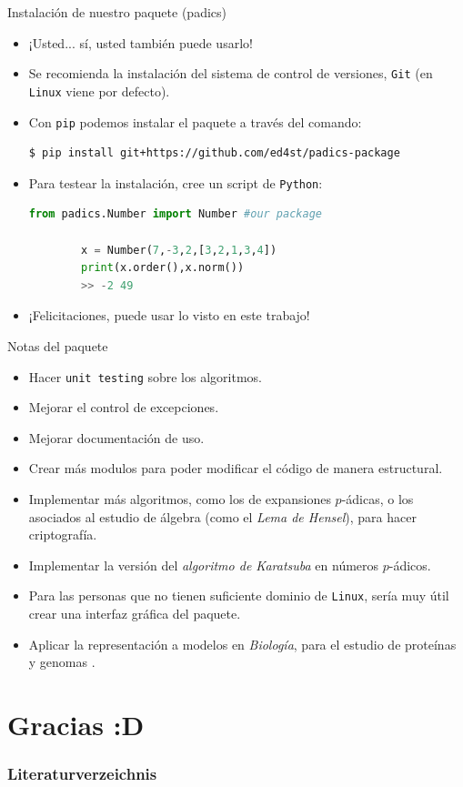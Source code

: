 \documentclass{beamer}
\theoremstyle{definition}
\numberwithin{equation}{section}
\newcommand{\tit}[1]{\textit{#1}}
\begin{document}
\begin{frame}[fragile]{Instalación de nuestro paquete (padics)}
	\begin{itemize}[<+- | alert@+>]
		\item ¡Usted... sí, usted también puede usarlo!
		\item Se recomienda la instalación del sistema de control de versiones, \texttt{Git} (en \texttt{Linux} viene por defecto).
		\item Con \texttt{pip} podemos instalar el paquete a través del comando:
		\begin{lstlisting}[caption=Terminal o símbolo del sistema,basicstyle=\tiny]
		$ pip install git+https://github.com/ed4st/padics-package	
		\end{lstlisting}
		\item Para testear la instalación, cree un script de \texttt{Python}:
		\begin{lstlisting}[language = Python, caption = test del paquete, basicstyle=\tiny]
		from padics.Number import Number #our package
		
		x = Number(7,-3,2,[3,2,1,3,4])
		print(x.order(),x.norm())
		>> -2 49
		\end{lstlisting}
		\item ¡Felicitaciones, puede usar lo visto en este trabajo!
	\end{itemize}
\end{frame}


\begin{frame}{Notas del paquete}
	\begin{itemize}[<+- | alert@+>]
		\item Hacer \texttt{unit testing} sobre los algoritmos.
		\item Mejorar el control de excepciones.
		\item Mejorar documentación de uso.
		\item Crear más modulos para poder modificar el código de manera estructural.
		\item Implementar más algoritmos, como los de expansiones $p$-ádicas, o los asociados al estudio de álgebra (como el \textit{Lema de Hensel}), para hacer criptografía.
		\item Implementar la versión del \textit{algoritmo de Karatsuba} en números $p$-ádicos.
		\item Para las personas que no tienen suficiente dominio de \texttt{Linux}, sería muy útil crear una interfaz gráfica del paquete.
		\item Aplicar la representación a modelos en \tit{Biología}, para el estudio de proteínas y genomas \cite{A-B-O}.
	\end{itemize}
\end{frame}

\section*{Gracias :D}







\begin{frame}[allowframebreaks]
	\frametitle{Literaturverzeichnis} 
	\nocite{*} 
	 
	 
\end{frame}
\end{document}
